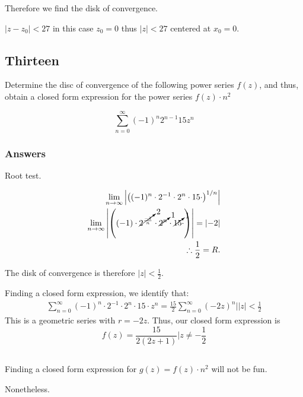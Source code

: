 \documentclass{article}
\begin{document}
Therefore we find the disk of convergence. 

$ |z - z_0| < 27 $ in this case $z_0 = 0$ thus $|z| <27$ centered at $x_0=0$.
\par

\subsection*{Thirteen}

Determine the disc of convergence of the following power series $f(z)$, and thus, obtain a closed form expression for the power series $f(z) \cdot n^2$

\begin{equation}\label{c13}
\sum_{n=0}^{\infty} (-1)^n2^{n-1}15z^n
\end{equation}


\subsubsection*{Answers}
Root test.

\begin{align*}
\lim_{n\to\infty} \left|\left( (-1)^n \cdot 2^{-1} \cdot 2^n \cdot 15 \cdot\right)^{1/n}\right|\\
\lim_{n\to\infty} \left|\left( (-1) \cdot \cancelto{2}{2^{\frac{-1}{n}}} \cdot \cancelto{1}{2^n} \cdot \cancelto{1}{15} \cdot\right)\right| = \left|-2\right| \\
\therefore \frac{1}{2} = R .
\end{align*}

The disk of convergence is therefore $\left|z\right| < \frac{1}{2}$.

Finding a closed form expression, we identify that:
\begin{align*}
\sum_{n=0}^{\infty}  (-1)^n \cdot 2^{-1} \cdot 2^n \cdot 15 \cdot z^n = \frac{15}{2} \sum_{n=0}^{\infty} (-2z)^n \Bigr| \left|z\right| < \frac{1}{2}
\end{align*}
This is a geometric series with $r = -2z$. Thus, our closed form expression is
\[
f(z) = \frac{15}{2(2z+1)} \Bigr| z \neq -\frac{1}{2}
\]

\subsection*{}

Finding a closed form expression for $g(z) = f(z) \cdot n^2$ will not be fun.

Nonetheless.
\end{document}

